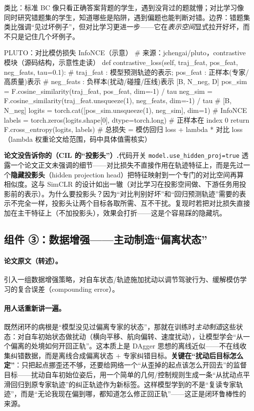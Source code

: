 类比：标准 BC 像只看正确答案背题的学生，遇到没背过的题就懵；对比学习像同时研究错题集的学生，知道哪些是陷阱，遇到偏题也能判断对错。边界：错题集类比强调“见过坏例子”，但对比学习更进一步——它在\emph{表示空间}显式拉开好坏，而不只是记住几个坏例子。

\begin{codebox}[Python]{PLUTO：对比模仿损失 InfoNCE（示意）}
# 来源：jchengai/pluto，contrastive 模块（源码结构，示意性走读）
def contrastive_loss(self, traj_feat, pos_feat, neg_feats, tau=0.1):
    # traj_feat : 模型预测轨迹的表示; pos_feat : 正样本(专家/高质量)表示
    # neg_feats : 负样本(扰动/碰撞/压线)表示 [B, N_neg, D]
    pos_sim = F.cosine_similarity(traj_feat, pos_feat, dim=-1) / tau
    neg_sim = F.cosine_similarity(traj_feat.unsqueeze(1), neg_feats, dim=-1) / tau  # [B, N_neg]
    logits = torch.cat([pos_sim.unsqueeze(1), neg_sim], dim=1)   # InfoNCE
    labels = torch.zeros(logits.shape[0], dtype=torch.long)      # 正样本在 index 0
    return F.cross_entropy(logits, labels)
# 总损失 = 模仿回归 loss + lambda * 对比 loss（lambda 权重论文给范围，码中具体值需核实）
\end{codebox}

\begin{note}
\textbf{论文没告诉你的（CIL 的“投影头”）.}\;代码开关 \texttt{model.\allowbreak use\_hidden\_proj=true} 透露一个论文正文未强调的细节——对比损失不直接作用在轨迹特征上，而是先过一个\textbf{隐藏投影头}（hidden projection head）把特征映射到一个专门的对比空间再算相似度。这与 SimCLR 的设计如出一辙（对比学习在投影空间做、下游任务用投影前的表示）。为什么要投影头？因为“对比判别好坏”和“回归预测轨迹”需要的表示不完全一样，投影头让两个目标各取所需、互不干扰。复现时若把对比损失直接加在主干特征上（不加投影头），效果会打折——这是个容易踩的隐藏坑。
\end{note}

\subsection{组件 ③：数据增强——主动制造“偏离状态”}
\label{sec:de-augment}

\paragraph{论文原文（转述）。}
引入一组数据增强策略，对自车状态/轨迹施加扰动以调节驾驶行为、缓解模仿学习的复合误差（compounding error）\cite{cheng2024pluto}。

\paragraph{用人话重新讲一遍。}
既然闭环的病根是“模型没见过偏离专家的状态”，那就在训练时\emph{主动制造}这些状态：对自车初始状态做扰动（横向平移、航向偏转、速度扰动），让模型学会“从一个偏离的处境如何开回正轨”。这本质上是 DAgger\cite{ross2011dagger} 思想的离线近似——不在线收集纠错数据，而是离线合成偏离状态 $+$ 专家纠错目标。\textbf{关键在“扰动后目标怎么定”}：只把起点挪歪还不够，还要给网络一个“从歪掉的起点该怎么开回去”的监督目标——扰动自车初始位姿后，用一个简单的几何/控制规则生成一条“从扰动点平滑回归到原专家轨迹”的纠正轨迹作为新标签。这样模型学到的不是“复读专家轨迹”，而是“无论我现在偏到哪，都知道怎么修正回正轨”——这正是闭环鲁棒性的来源。

